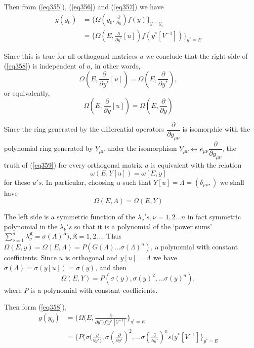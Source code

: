 Then from (\ref{eq355}), (\ref{eq356}) and (\ref{eq357}) we have 
\begin{align*}
g (y_0) & = \{ \Omega (y_0 , \frac{\partial}{\partial y})  f (y) \}_{y
  = y_o} \\ 
& = \{ \Omega (E, \frac{\partial}{\partial y^*} [u]) f (y^* [V^{-1}])
\}_{y^* = E} \tag{358}\label{eq358} 
\end{align*}\pageoriginale

Since this is true for all orthogonal matrices $u$ we conclude that
the right side of (\ref{eq358}) is independent of $u$, in other words,  
$$
\Omega (E , \frac{\partial}{\partial y^*}[u]) = \Omega (E ,
\frac{\partial}{\partial y^*}), 
$$
or equivalently,
\begin{equation*}
\Omega (E, \frac{\partial}{\partial y} [u]) = \Omega (E,
\frac{\partial}{\partial y}) \tag{359}\label{eq359} 
\end{equation*}

Since the ring generated by the differential operators
$\dfrac{\partial}{\partial y_{\mu \nu}}$ is isomorphic with the
polynomial ring generated by $Y_{\mu \nu}$ under the isomorphism
$Y_{\mu \nu} \leftrightarrow e_{\mu \nu} \dfrac{\partial}{\partial
  y_{\mu \nu}}$, the truth of (\ref{eq359}) for every orthogonal matrix $u$
is equivalent with the relation 
$$
\omega (E, Y[u]) = \omega [E,y]
$$
for these $u's$. In particular, choosing $u$ such that $Y[u] =
\Lambda = (\delta _{\mu \nu}, )$ we shall have 
\begin{equation*}
\Omega(E, \Lambda) = \Omega (E, Y) \tag{360}\label{eq360}
\end{equation*}

The left side is a symmetric function of the $\lambda_\nu ' s , \nu =
1,2 \ldots n$ in fact symmetric polynomial in the $\lambda _\nu 's$ so
that it is a polynomial of the `power sums' $\sum^n_{\nu = 1}
\lambda^\mathfrak{K}_\nu = \sigma (\Lambda)^{\mathfrak{K}}), \mathfrak{K}
= 1,2 \ldots$. Thus $\Omega (E , y) = \Omega (E, \Lambda) =
P(G(\Lambda) \ldots \sigma (\Lambda)^n) $, a polynomial with constant
coefficients. Since $u$ is orthogonal and $y[u] = \Lambda$ we have
$\sigma (\Lambda) = \sigma (y [u]) = \sigma(y)$, and then  
\begin{equation*}
\Omega(E, Y) = P(\sigma (y), \sigma(y)^2 , \ldots \sigma(y)^n),
\tag{361}\label{eq361} 
\end{equation*}\pageoriginale
where $P$ is a polynomial with constant coefficients. 

Then form (\ref{eq358}),
\begin{align*}
g(y_0) & = \{ \Omega (E , \frac{\partial}{\partial y^*) f(y^*
  [V^{-1}]}\}_{y^* = E} \\ 
& = \{ P (\sigma (\frac{\partial}{\partial y^*)},
\sigma(\frac{\partial}{\partial y^*})^2 ,\ldots
\sigma(\frac{\partial}{\partial y^*})^n s (y^* [V^{-1}] \} _{y^* =E} 
\end{align*}

